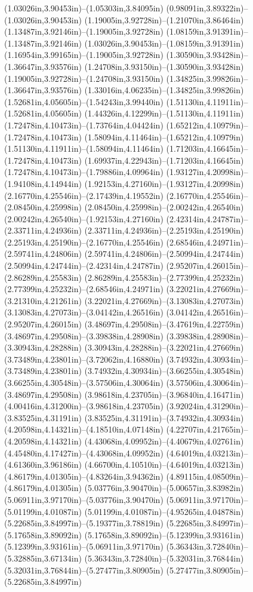 (1.03026in,3.90453in)--(1.05303in,3.84095in) (0.98091in,3.89322in)--(1.03026in,3.90453in) (1.19005in,3.92728in)--(1.21070in,3.86464in) (1.13487in,3.92146in)--(1.19005in,3.92728in) (1.08159in,3.91391in)--(1.13487in,3.92146in) (1.03026in,3.90453in)--(1.08159in,3.91391in) (1.16954in,3.99165in)--(1.19005in,3.92728in) (1.30590in,3.93428in)--(1.36647in,3.93576in) (1.24708in,3.93150in)--(1.30590in,3.93428in) (1.19005in,3.92728in)--(1.24708in,3.93150in) (1.34825in,3.99826in)--(1.36647in,3.93576in) (1.33016in,4.06235in)--(1.34825in,3.99826in) (1.52681in,4.05605in)--(1.54243in,3.99440in) (1.51130in,4.11911in)--(1.52681in,4.05605in) (1.44326in,4.12299in)--(1.51130in,4.11911in) (1.72478in,4.10473in)--(1.73764in,4.04424in) (1.65212in,4.10979in)--(1.72478in,4.10473in) (1.58094in,4.11464in)--(1.65212in,4.10979in) (1.51130in,4.11911in)--(1.58094in,4.11464in) (1.71203in,4.16645in)--(1.72478in,4.10473in) (1.69937in,4.22943in)--(1.71203in,4.16645in) (1.72478in,4.10473in)--(1.79886in,4.09964in) (1.93127in,4.20998in)--(1.94108in,4.14944in) (1.92153in,4.27160in)--(1.93127in,4.20998in) (2.16770in,4.25546in)--(2.17439in,4.19552in) (2.16770in,4.25546in)--(2.08450in,4.25998in) (2.08450in,4.25998in)--(2.00242in,4.26540in) (2.00242in,4.26540in)--(1.92153in,4.27160in) (2.42314in,4.24787in)--(2.33711in,4.24936in) (2.33711in,4.24936in)--(2.25193in,4.25190in) (2.25193in,4.25190in)--(2.16770in,4.25546in) (2.68546in,4.24971in)--(2.59741in,4.24806in) (2.59741in,4.24806in)--(2.50994in,4.24744in) (2.50994in,4.24744in)--(2.42314in,4.24787in) (2.95207in,4.26015in)--(2.86289in,4.25583in) (2.86289in,4.25583in)--(2.77399in,4.25232in) (2.77399in,4.25232in)--(2.68546in,4.24971in) (3.22021in,4.27669in)--(3.21310in,4.21261in) (3.22021in,4.27669in)--(3.13083in,4.27073in) (3.13083in,4.27073in)--(3.04142in,4.26516in) (3.04142in,4.26516in)--(2.95207in,4.26015in) (3.48697in,4.29508in)--(3.47619in,4.22759in) (3.48697in,4.29508in)--(3.39838in,4.28908in) (3.39838in,4.28908in)--(3.30943in,4.28288in) (3.30943in,4.28288in)--(3.22021in,4.27669in) (3.73489in,4.23801in)--(3.72062in,4.16880in) (3.74932in,4.30934in)--(3.73489in,4.23801in) (3.74932in,4.30934in)--(3.66255in,4.30548in) (3.66255in,4.30548in)--(3.57506in,4.30064in) (3.57506in,4.30064in)--(3.48697in,4.29508in) (3.98618in,4.23705in)--(3.96840in,4.16471in) (4.00416in,4.31200in)--(3.98618in,4.23705in) (3.92024in,4.31290in)--(3.83525in,4.31191in) (3.83525in,4.31191in)--(3.74932in,4.30934in) (4.20598in,4.14321in)--(4.18510in,4.07148in) (4.22707in,4.21765in)--(4.20598in,4.14321in) (4.43068in,4.09952in)--(4.40679in,4.02761in) (4.45480in,4.17427in)--(4.43068in,4.09952in) (4.64019in,4.03213in)--(4.61360in,3.96186in) (4.66700in,4.10510in)--(4.64019in,4.03213in) (4.86179in,4.01305in)--(4.83264in,3.94362in) (4.89115in,4.08509in)--(4.86179in,4.01305in) (5.03776in,3.90470in)--(5.00657in,3.83982in) (5.06911in,3.97170in)--(5.03776in,3.90470in) (5.06911in,3.97170in)--(5.01199in,4.01087in) (5.01199in,4.01087in)--(4.95265in,4.04878in) (5.22685in,3.84997in)--(5.19377in,3.78819in) (5.22685in,3.84997in)--(5.17658in,3.89092in) (5.17658in,3.89092in)--(5.12399in,3.93161in) (5.12399in,3.93161in)--(5.06911in,3.97170in) (5.36343in,3.72840in)--(5.32885in,3.67134in) (5.36343in,3.72840in)--(5.32031in,3.76844in) (5.32031in,3.76844in)--(5.27477in,3.80905in) (5.27477in,3.80905in)--(5.22685in,3.84997in) 